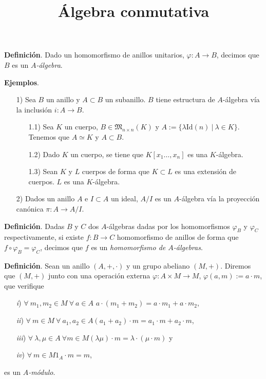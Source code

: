 \documentclass[a4paper,12pt]{article}
\begin{document}
\title{Álgebra conmutativa}
\author{}
\date{}
\maketitle

\textbf{Definición}. Dado un homomorfismo de anillos unitarios, $\varphi: A\longrightarrow B$, decimos que $B$ es un \textit{$A$-álgebra}.

\textbf{Ejemplos}.\begin{itemize}
    \item[1)]Sea $B$ un anillo y $A\subset B$ un subanillo. $B$ tiene estructura de $A$-álgebra vía la inclusión $i: A\longrightarrow B$.\begin{itemize}
        \item[1.1)]Sea $K$ un cuerpo, $B\in\mathfrak{M}_{n\times n}(K)$ y $A:=\{\lambda\text{Id}(n)\ |\ \lambda\in K\}$. Tenemos que $A\simeq K$ y $A\subset B$.
        \item[1.2)] Dado $K$ un cuerpo, se tiene que $K[x_1\dots,x_n]$ es una $K$-álgebra.
        \item[1.3)] Sean $K$ y $L$ cuerpos de forma que $K\subset L$ es una extensión de cuerpos. $L$ es una $K$-álgebra.
    \end{itemize}
    \item[2)] Dados un anillo $A$ e $I\subset A$ un ideal, $A/I$ es un $A$-álgebra vía la proyección canónica $\pi: A\longrightarrow A/I$.
\end{itemize}

\textbf{Definición}. Dadas $B$ y $C$ dos $A$-álgebras dadas por los homomorfismos $\varphi_B$ y $\varphi_C$ respectivamente, si existe $f: B\longrightarrow C$ homomorfismo de anillos de forma que $f\circ \varphi_B=\varphi_C$, decimos que $f$ es un \textit{homomorfismo de $A$-álgebras}.

\textbf{Definición}. Sean un anillo $(A,+,\cdot)$ y un grupo abeliano $(M,+)$. 
Diremos que $(M,+)$ junto con una operación externa $\varphi: A\times M\longrightarrow M$, $\varphi(a,m):=a\cdot m$, que verifique
\begin{itemize}
    \item[\textit{i})] $\forall\ m_1,m_2\in M\ \forall\ a\in A$\hspace{15pt} $a\cdot(m_1+m_2)=a\cdot m_1+a\cdot m_2$,
    \item[\textit{ii})] $\forall\ m\in M\ \forall\ a_1,a_2\in A$\hspace{15pt}$(a_1+a_2)\cdot m=a_1\cdot m+a_2\cdot m$,
    \item[\textit{iii})]$\forall\ \lambda,\mu\in A\ \forall m\in M$\hspace{15pt}$(\lambda\mu)\cdot m=\lambda\cdot(\mu\cdot m)$ y
    \item[\textit{iv})]$\forall\ m\in M$\hspace{15pt}$1_A\cdot m=m$,
\end{itemize}es un \textit{$A$-módulo}.
\end{document}
